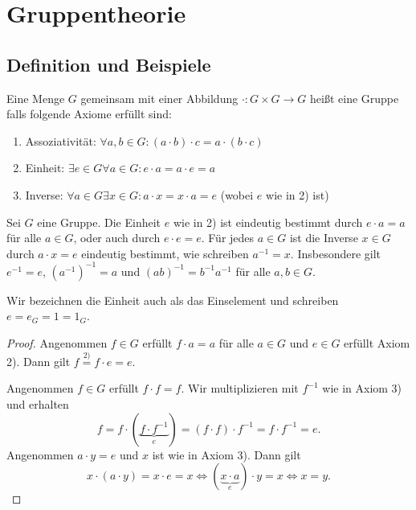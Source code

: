 \graphicspath{{Images/}}

\chapter{Gruppentheorie}
\section{Definition und Beispiele}

\begin{definition}
	Eine Menge $G$ gemeinsam mit einer Abbildung $\cdot : G \times G \to G$ heißt eine Gruppe falls folgende Axiome erfüllt sind:
	\begin{enumerate}
		\item Assoziativität: $\forall a,b \in G: (a \cdot  b) \cdot  c = a \cdot (b \cdot c)$
		\item Einheit: $\exists e \in G \forall a \in G: e \cdot a = a \cdot e = a$
		\item Inverse: $\forall a \in G \exists x \in G: a \cdot  x = x \cdot a = e$ (wobei $e$ wie in 2) ist)
	\end{enumerate}
\end{definition}

\begin{lemma}
	Sei $G$ eine Gruppe.  Die Einheit $e$ wie in 2) ist eindeutig bestimmt durch $e \cdot  a = a$
	für alle $a \in G$, oder  auch durch $e \cdot e = e$. Für jedes $a \in G$ ist die Inverse $x \in G$ durch
	$a \cdot x = e$ eindeutig bestimmt, wie schreiben $a^{-1} = x$.
	Insbesondere gilt $e^{-1} = e$, $(a^{-1})^{-1} = a$ und $(ab)^{-1} = b^{-1} a^{-1}$ für alle $a,b \in G$.
\end{lemma}

\begin{remark}
	Wir bezeichnen die Einheit auch als das Einselement und schreiben $e = e_{G} = 1 = 1_{G}$.
\end{remark}

\begin{proof}
	Angenommen $f \in G$ erfüllt $f \cdot a = a$ für alle $a \in G$ und $e \in G$ erfüllt Axiom 2).
	Dann gilt $f \stackrel{2)}{=} f \cdot e = e$.

	Angenommen $f \in G$ erfüllt $f \cdot f = f$. Wir multiplizieren mit $f^{-1}$ wie in Axiom 3) und erhalten
	\[
		f = f \cdot (\underbrace{f \cdot f^{-1}}_{e}) = (f \cdot f) \cdot f^{-1} = f \cdot f^{-1}= e
	.\] 
	Angenommen $a \cdot y = e$ und $x$ ist wie in Axiom 3). Dann gilt
	\[
		x \cdot (a \cdot y) = x \cdot e = x \Leftrightarrow (\underbrace{x\cdot a}_{e} ) \cdot y = x \Leftrightarrow x = y
	.\] 
\end{proof}

